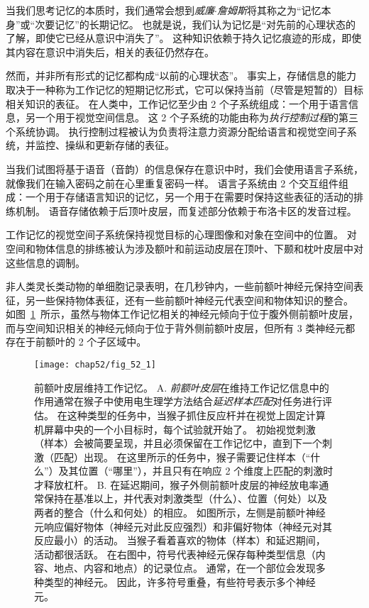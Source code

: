 当我们思考记忆的本质时，我们通常会想到\textit{威廉$\cdot$詹姆斯}将其称之为“记忆本身”或“次要记忆”的长期记忆。
也就是说，我们认为记忆是“对先前的心理状态的了解，即使它已经从意识中消失了”。
这种知识依赖于持久记忆痕迹的形成，即使其内容在意识中消失后，相关的表征仍然存在。


然而，并非所有形式的记忆都构成“以前的心理状态”。
事实上，存储信息的能力取决于一种称为工作记忆的短期记忆形式，它可以保持当前（尽管是短暂的）目标相关知识的表征。
在人类中，工作记忆至少由 2 个子系统组成：一个用于语言信息，另一个用于视觉空间信息。
这 2 个子系统的功能由称为\textit{执行控制过程}的第三个系统协调。
执行控制过程被认为负责将注意力资源分配给语言和视觉空间子系统，并监控、操纵和更新存储的表征。


当我们试图将基于语音（音韵）的信息保存在意识中时，我们会使用语言子系统，就像我们在输入密码之前在心里重复密码一样。
语言子系统由 2 个交互组件组成：一个用于存储语言知识的记忆，另一个用于在需要时保持这些表征的活动的排练机制。
语音存储依赖于后顶叶皮层，而复述部分依赖于布洛卡区的发音过程。


工作记忆的视觉空间子系统保持视觉目标的心理图像和对象在空间中的位置。
对空间和物体信息的排练被认为涉及额叶和前运动皮层在顶叶、下颞和枕叶皮层中对这些信息的调制。


非人类灵长类动物的单细胞记录表明，在几秒钟内，一些前额叶神经元保持空间表征，另一些保持物体表征，还有一些前额叶神经元代表空间和物体知识的整合。
如图~\ref{fig:52_1}~所示，虽然与物体工作记忆相关的神经元倾向于位于腹外侧前额叶皮层，而与空间知识相关的神经元倾向于位于背外侧前额叶皮层，但所有 3 类神经元都存在于前额叶的 2 个子区域中。


\begin{figure}[htbp]
	\centering
	\texttt{[image: chap52/fig\_52\_1]}
	\caption{前额叶皮层维持工作记忆\cite{rainer1998memory}。
		A. \textit{前额叶皮层}在维持工作记忆信息中的作用通常在猴子中使用电生理学方法结合\textit{延迟样本匹配}对任务进行评估。
		在这种类型的任务中，当猴子抓住反应杆并在视觉上固定计算机屏幕中央的一个小目标时，每个试验就开始了。
		初始视觉刺激（样本）会被简要呈现，并且必须保留在工作记忆中，直到下一个刺激（匹配）出现。
		在这里所示的任务中，猴子需要记住样本（“什么”）及其位置（“哪里”），并且只有在响应 2 个维度上匹配的刺激时才释放杠杆。
		B. 在延迟期间，猴子外侧前额叶皮层的神经放电率通常保持在基准以上，并代表对刺激类型（什么）、位置（何处）以及两者的整合（什么和何处）的相应。
		如图所示，左侧是前额叶神经元响应偏好物体（神经元对此反应强烈）和非偏好物体（神经元对其反应最小）的活动。
		当猴子看着喜欢的物体（样本）和延迟期间，活动都很活跃。
		在右图中，符号代表神经元保存每种类型信息（内容、地点、内容和地点）的记录位点。
		通常，在一个部位会发现多种类型的神经元。
		因此，许多符号重叠，有些符号表示多个神经元。}
	\label{fig:52_1}
\end{figure}


